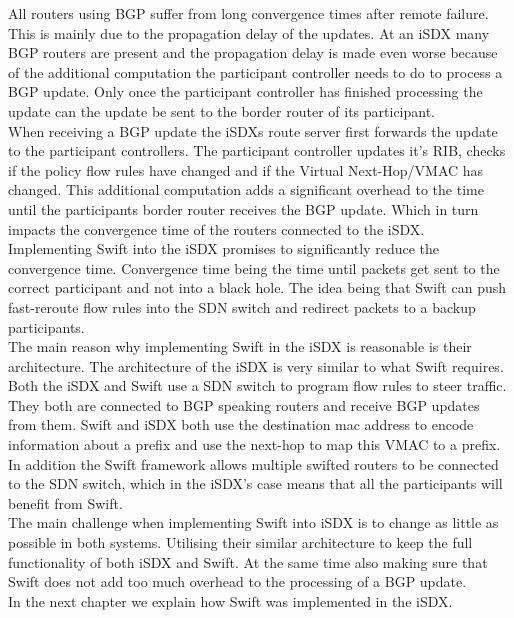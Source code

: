 All routers using BGP suffer from long convergence times after remote failure. This is mainly due to the propagation delay of the updates. At an iSDX many BGP routers are present and the propagation delay is made even worse because of the additional computation the participant controller needs to do to process a BGP update. Only once the participant controller has finished processing the update can the update be sent to the border router of its participant.  \\
When receiving a BGP update the iSDXs route server first forwards the update to the participant controllers. The participant controller updates it's RIB, checks if the policy flow rules have changed and if the Virtual Next-Hop/VMAC has changed. This additional computation adds a significant overhead to the time until the participants border router receives the BGP update. Which in turn impacts the convergence time of the routers connected to the iSDX. \\
Implementing Swift into the iSDX promises to significantly reduce the convergence time. Convergence time being the time until packets get sent to the correct participant and not into a black hole. The idea being that Swift can push fast-reroute flow rules into the SDN switch and redirect packets to a backup participants.\\
The main reason why implementing Swift in the iSDX is reasonable is their architecture. The architecture of the iSDX is very similar to what Swift requires. Both the iSDX and Swift use a SDN switch to program flow rules to steer traffic. They both are connected to BGP speaking routers and receive BGP updates from them. Swift and iSDX both use the destination mac address to encode information about a prefix and use the next-hop to map this VMAC to a prefix. In addition the Swift framework allows multiple swifted routers to be connected to the SDN switch, which in the iSDX's case means that all the participants will benefit from Swift. \\
The main challenge when implementing Swift into iSDX is to change as little as possible in both systems. Utilising their similar architecture to keep the full functionality of both iSDX and Swift. At the same time also making sure that Swift does not add too much overhead to the processing of a BGP update. \\
In the next chapter we explain how Swift was implemented in the iSDX. 
